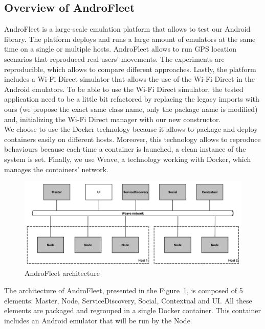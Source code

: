 \subsection{Overview of AndroFleet}

AndroFleet is a large-scale emulation platform that allows to test our Android library.
The platform deploys and runs a large amount of emulators at the same time on a single or multiple hosts.
AndroFleet allows to run GPS location scenarios that reproduced real users' movements.
The experiments are reproducible, which allows to compare different approaches.
Lastly, the platform includes a Wi-Fi Direct simulator that allows the use of the Wi-Fi Direct in the Android emulators.
To be able to use the Wi-Fi Direct simulator, the tested application need to be a little bit refactored by replacing the legacy imports with ours (we propose the exact same class name, only the package name is modified) and, initializing the Wi-Fi Direct manager with our new constructor.
\\

We choose to use the Docker technology because it allows to package and deploy containers easily on different hosts.
Moreover, this technology allows to reproduce behaviours because each time a container is launched, a clean instance of the system is set.
Finally, we use Weave, a technology working with Docker, which manages the containers' network.

\begin{figure}[h]
    \centering
    \includegraphics[width=\textwidth]{figures/androfleet}
    \caption{\label{AndroFleet} AndroFleet architecture}
\end{figure}

The architecture of AndroFleet, presented in the Figure~\ref{AndroFleet}, is composed of 5 elements: Master, Node, ServiceDiscovery, Social, Contextual and UI.
All these elements are packaged and regrouped in a single Docker container.
This container includes an Android emulator that will be run by the Node.
\\

